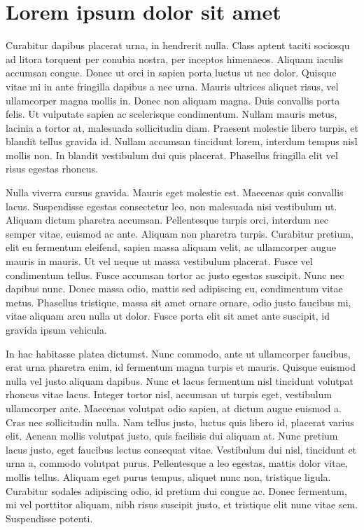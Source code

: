 \documentclass{projetofinal-dcc}
\begin{document}
\section{Lorem ipsum dolor sit amet}\label{sec:LABEL_CHP_1_SEC_I}
Curabitur dapibus placerat urna, in hendrerit nulla. Class aptent taciti sociosqu ad litora torquent per conubia nostra, per inceptos himenaeos. Aliquam iaculis accumsan congue. Donec ut orci in sapien porta luctus ut nec dolor. Quisque vitae mi in ante fringilla dapibus a nec urna. Mauris ultrices aliquet risus, vel ullamcorper magna mollis in. Donec non aliquam magna. Duis convallis porta felis. Ut vulputate sapien ac scelerisque condimentum. Nullam mauris metus, lacinia a tortor at, malesuada sollicitudin diam. Praesent molestie libero turpis, et blandit tellus gravida id. Nullam accumsan tincidunt lorem, interdum tempus nisl mollis non. In blandit vestibulum dui quis placerat. Phasellus fringilla elit vel risus egestas rhoncus.

Nulla viverra cursus gravida. Mauris eget molestie est. Maecenas quis convallis lacus. Suspendisse egestas consectetur leo, non malesuada nisi vestibulum ut. Aliquam dictum pharetra accumsan. Pellentesque turpis orci, interdum nec semper vitae, euismod ac ante. Aliquam non pharetra turpis. Curabitur pretium, elit eu fermentum eleifend, sapien massa aliquam velit, ac ullamcorper augue mauris in mauris. Ut vel neque ut massa vestibulum placerat. Fusce vel condimentum tellus. Fusce accumsan tortor ac justo egestas suscipit. Nunc nec dapibus nunc. Donec massa odio, mattis sed adipiscing eu, condimentum vitae metus. Phasellus tristique, massa sit amet ornare ornare, odio justo faucibus mi, vitae aliquam arcu nulla ut dolor. Fusce porta elit sit amet ante suscipit, id gravida ipsum vehicula.

In hac habitasse platea dictumst. Nunc commodo, ante ut ullamcorper faucibus, erat urna pharetra enim, id fermentum magna turpis et mauris. Quisque euismod nulla vel justo aliquam dapibus. Nunc et lacus fermentum nisl tincidunt volutpat rhoncus vitae lacus. Integer tortor nisl, accumsan ut turpis eget, vestibulum ullamcorper ante. Maecenas volutpat odio sapien, at dictum augue euismod a. Cras nec sollicitudin nulla. Nam tellus justo, luctus quis libero id, placerat varius elit. Aenean mollis volutpat justo, quis facilisis dui aliquam at. Nunc pretium lacus justo, eget faucibus lectus consequat vitae. Vestibulum dui nisl, tincidunt et urna a, commodo volutpat purus. Pellentesque a leo egestas, mattis dolor vitae, mollis tellus. Aliquam eget purus tempus, aliquet nunc non, tristique ligula. Curabitur sodales adipiscing odio, id pretium dui congue ac. Donec fermentum, mi vel porttitor aliquam, nibh risus suscipit justo, et tristique elit nunc vitae sem. Suspendisse potenti.
\end{document}
